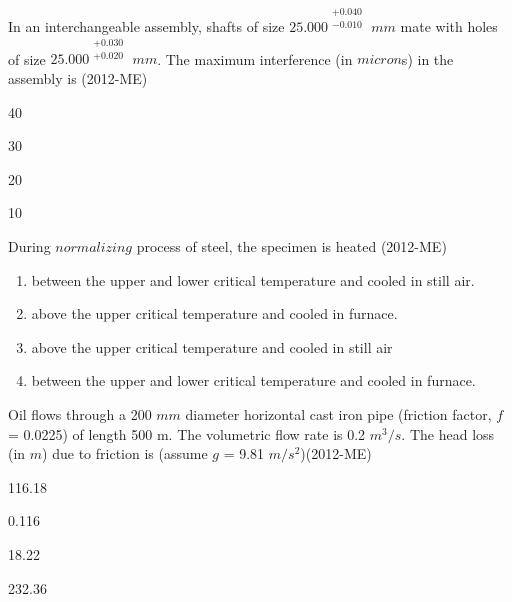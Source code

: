 \item In an interchangeable assembly, shafts of size ${25.000}^{\begin{smallmatrix}+0.040 \\ -0.010 
\end{smallmatrix}}$ $mm$ mate with holes of size  $ 25.000^{ \begin{smallmatrix} +0.030 \\ +0.020 \end{smallmatrix} }
$ $mm$. The maximum interference (in $micron$s) in the assembly is \hfill{(2012-ME)} 
                 \begin{enumerate}   
                     \begin{multicols}{4} 
\item 40
\item 30
\item 20
\item 10

		     \end{multicols}                            
                         \end{enumerate}





\item During $normalizing$ process of steel, the specimen is heated \hfill{(2012-ME)}
\begin{enumerate}
\item  between the upper and lower critical temperature and cooled in still air.
\item  above the upper critical temperature and cooled in furnace.
\item  above the upper critical temperature and cooled in still air
\item  between the upper and lower critical temperature and cooled in furnace.
\end{enumerate}

\item Oil flows through a 200 $mm$ diameter horizontal cast iron pipe (friction factor, $f$ = 0.0225) of length 500 m. The volumetric flow rate is 0.2 $m^3/s$. The head loss (in $m$) due to friction is (assume $g$ = 9.81 $m/s^2$)\hfill{(2012-ME)}
\begin{enumerate}
\begin{multicols}{4} 
\item 116.18
\item 0.116
\item 18.22
\item 232.36
\end{multicols}  
\end{enumerate}


